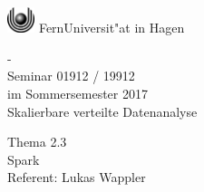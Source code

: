 \thispagestyle{empty}
\begin{center}
\begin{huge}
\vspace*{3cm}
   \begin{minipage}{\textwidth}
     \vspace*{\fill}
    \begin{center}
       \includegraphics[width=0.8cm]{./logo/logo.eps} FernUniversit"at in Hagen
    \end{center}
     \vfill
   \end{minipage}
   -\\
   Seminar 01912 / 19912 \\
   im Sommersemester 2017 \\[2em]
   \glqq{}Skalierbare verteilte Datenanalyse\grqq{} \\[2cm]
\end{huge}
\begin{large}
   Thema 2.3\\[1em]
   Spark\\[3cm]
   Referent: Lukas Wappler
\end{large}

\end{center}
